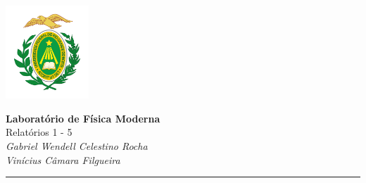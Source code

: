 \documentclass[12pt,a4paper]{article}
\begin{document}
\textcolor{UM_Brown}{
\begin{minipage}{0.1\textwidth}
    \begin{flushleft}
        \includegraphics[height=3.5cm]{Figures/UFRN_Brasao.png}
    \end{flushleft}
\end{minipage}
\begin{minipage}{0.8\textwidth}
    \begin{center}
        \textbf{\Large Laboratório de Física Moderna}\\
        \vspace{5pt}
        Relatórios 1 - 5 \\
        \vspace{20pt}
        \textit{Gabriel Wendell Celestino Rocha} \\
        \vspace{5pt}
        \textit{Vinícius Câmara Filgueira}
    \end{center}
\end{minipage}
\vspace{10pt}
\hrule
}



\end{document}
